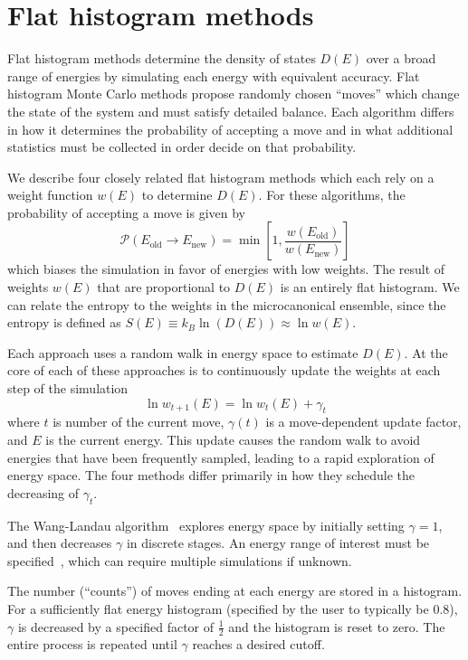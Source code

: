 \documentclass[letterpaper,twocolumn,amsmath,amssymb,pre,aps,10pt]{revtex4-1}
\begin{document}
\section{Flat histogram methods}\label{sec:histogram}
Flat histogram methods determine the density of states $D(E)$ over a broad range
of energies by simulating each energy with equivalent accuracy. Flat histogram
Monte Carlo methods propose randomly chosen ``moves'' which change the state of
the system and must satisfy detailed balance.  Each algorithm differs in how it
determines the probability of accepting a move and in what additional statistics
must be collected in order decide on that probability.

We describe four closely related flat histogram methods which each rely on a
weight function $w(E)$ to determine $D(E)$.  For these algorithms, the
probability of accepting a move is given by
\begin{equation}
	\mathcal{P}(E_\text{old} \rightarrow E_\text{new})
	= \min\left[1,\frac{w(E_\text{old})}{w(E_\text{new})}\right]
\end{equation}
which biases the simulation in favor of energies with low weights. The result of
weights $w(E)$ that are proportional to $D(E)$ is an entirely flat histogram. We
can relate the entropy to the weights in the microcanonical ensemble, since the
entropy is defined as $S(E) \equiv k_B\ln(D(E)) \approx \ln w(E)$.

Each approach uses a random walk in energy space to estimate $D(E)$.  At the
core of each of these approaches is to continuously update the weights at each
step of the simulation
\begin{equation}
	\ln{w_{t+1}(E)}=\ln{w_{t}(E)}
	+\gamma_t
\end{equation}
where $t$ is number of the current move, $\gamma(t)$ is a move-dependent update
factor, and $E$ is the current energy.  This update causes the random walk to
avoid energies that have been frequently sampled, leading to a rapid exploration
of energy space. The four methods differ primarily in how they schedule the
decreasing of $\gamma_t$.

The Wang-Landau algorithm~\cite{wang2001efficient,wang2001determining,
landau2014guide} explores energy space by initially setting $\gamma=1$, and then
decreases $\gamma$ in discrete stages. An energy range of interest must be
specified~\cite{wang2001efficient, schulz2003avoiding, yan2003fast},
which can require multiple simulations if unknown.

The number (``counts'') of moves ending at each energy are stored in a
histogram.  For a sufficiently flat energy histogram (specified by the user to
typically be 0.8), $\gamma$ is decreased by a specified factor of $\frac12$ and
the histogram is reset to zero. The entire process is repeated until $\gamma$
reaches a desired cutoff.
\end{document}

